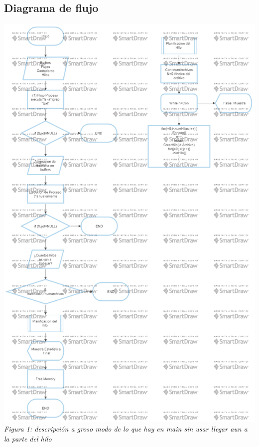 \documentclass[11pt,a4paper]{article}
\begin{document}
\subsection{Diagrama de flujo}
\begin{center}
  \includegraphics[scale=0.4]{diagramaFlujo.png}\\
  \textit{Figura 1: descripción a groso modo de lo que hay en main sin usar llegar aun a la parte del hilo}

\end{center}
\end{document}
